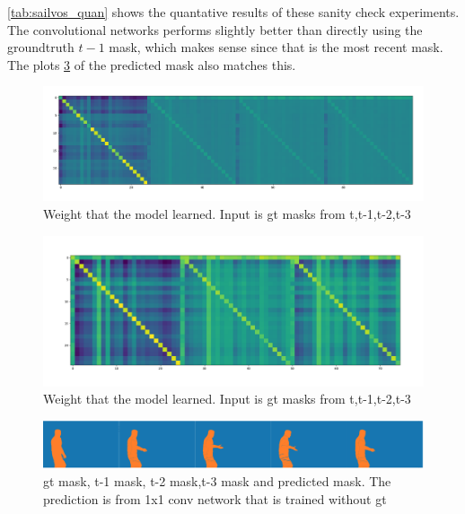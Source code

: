 \ref{tab:sailvos_quan} shows the quantative results of these sanity check experiments. The convolutional networks performs slightly better than directly using the groundtruth $t-1$ mask, which makes sense since that is the most recent mask. The plots \ref{fig:plot1} of the predicted mask also matches this.

\begin{figure}
\centering
\includegraphics[scale=0.1]{fig/weights_4.png}
\caption{Weight that the model learned. Input is gt masks from t,t-1,t-2,t-3}
\label{fig:w4}
\end{figure}
\begin{figure}
\centering
\includegraphics[scale=0.12]{fig/weights_3.png}
\caption{Weight that the model learned. Input is gt masks from t,t-1,t-2,t-3}
\label{fig:w3}
\end{figure}

\begin{figure}
\centering
\includegraphics[scale=0.23]{fig/pred.png}
\caption{gt mask, t-1 mask, t-2 mask,t-3 mask and predicted mask. The prediction is from 1x1 conv network that is trained without gt}
\label{fig:plot1}
\end{figure}




